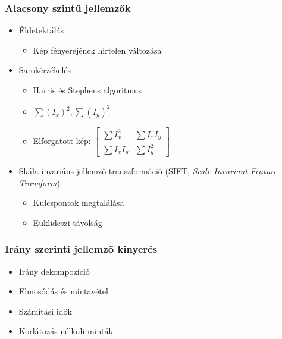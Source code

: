 \documentclass{beamer}
\begin{document}
\begin{frame}[fragile]
\frametitle{Alacsony szintű jellemzők}

\begin{itemize}
\item Éldetektálás
	\begin{itemize}
		\item Kép fényerejének hirtelen változása
	\end{itemize}
\item Sarokérzékelés
	\begin{itemize}
		\item Harris és Stephens algoritmus
		\item \(\sum (I_x)^2, \sum (I_y)^2 \)
		\item Elforgatott kép: ${\begin{bmatrix}\sum I_{x}^{2} &\sum I_{x}I_{y} \\\sum I_{x}I_{y} &\sum I_{y}^{2} \end{bmatrix}}$
	\end{itemize}
\item Skála invariáns jellemző transzformáció (SIFT, \textit{Scale Invariant Feature Transform})
	\begin{itemize}
		\item Kulcspontok megtalálása
		\item Euklideszi távolság
	\end{itemize}
\end{itemize}

\end{frame}

\begin{frame}[fragile]
\frametitle{Irány szerinti jellemző kinyerés}

\begin{itemize}
\item Irány dekompozíció
\item Elmosódás és mintavétel
\item Számítási idők
\item Korlátozás nélküli minták
\end{itemize}

\end{frame}
\end{document}
